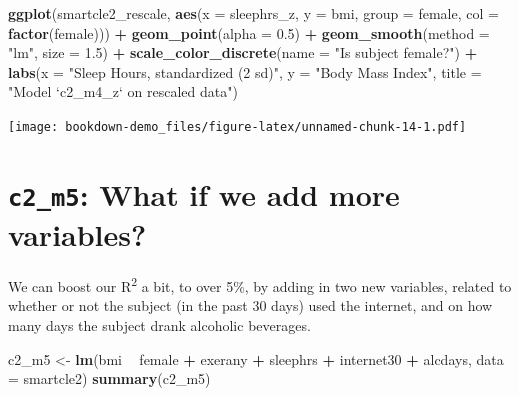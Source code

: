 \documentclass[]{book}
\newenvironment{Shaded}{\begin{snugshade}}{\end{snugshade}}
\newcommand{\KeywordTok}[1]{\textcolor[rgb]{0.13,0.29,0.53}{\textbf{#1}}}
\newcommand{\DataTypeTok}[1]{\textcolor[rgb]{0.13,0.29,0.53}{#1}}
\newcommand{\FloatTok}[1]{\textcolor[rgb]{0.00,0.00,0.81}{#1}}
\newcommand{\StringTok}[1]{\textcolor[rgb]{0.31,0.60,0.02}{#1}}
\newcommand{\OperatorTok}[1]{\textcolor[rgb]{0.81,0.36,0.00}{\textbf{#1}}}
\newcommand{\NormalTok}[1]{#1}
\theoremstyle{definition}
\theoremstyle{definition}
\theoremstyle{definition}
\theoremstyle{remark}
\begin{document}
\begin{Shaded}
\begin{Highlighting}[]
\KeywordTok{ggplot}\NormalTok{(smartcle2_rescale, }\KeywordTok{aes}\NormalTok{(}\DataTypeTok{x =}\NormalTok{ sleephrs_z, }\DataTypeTok{y =}\NormalTok{ bmi, }
                              \DataTypeTok{group =}\NormalTok{ female, }\DataTypeTok{col =} \KeywordTok{factor}\NormalTok{(female))) }\OperatorTok{+}
\StringTok{    }\KeywordTok{geom_point}\NormalTok{(}\DataTypeTok{alpha =} \FloatTok{0.5}\NormalTok{) }\OperatorTok{+}
\StringTok{    }\KeywordTok{geom_smooth}\NormalTok{(}\DataTypeTok{method =} \StringTok{"lm"}\NormalTok{, }\DataTypeTok{size =} \FloatTok{1.5}\NormalTok{) }\OperatorTok{+}
\StringTok{    }\KeywordTok{scale_color_discrete}\NormalTok{(}\DataTypeTok{name =} \StringTok{"Is subject female?"}\NormalTok{) }\OperatorTok{+}
\StringTok{    }\KeywordTok{labs}\NormalTok{(}\DataTypeTok{x =} \StringTok{"Sleep Hours, standardized (2 sd)"}\NormalTok{, }\DataTypeTok{y =} \StringTok{"Body Mass Index"}\NormalTok{,}
         \DataTypeTok{title =} \StringTok{"Model `c2_m4_z` on rescaled data"}\NormalTok{)}
\end{Highlighting}
\end{Shaded}

\texttt{[image: bookdown-demo\_files/figure-latex/unnamed-chunk-14-1.pdf]}

\section{\texorpdfstring{\texttt{c2\_m5}: What if we add more
variables?}{c2\_m5: What if we add more variables?}}\label{c2_m5-what-if-we-add-more-variables}

We can boost our R\textsuperscript{2} a bit, to over 5\%, by adding in
two new variables, related to whether or not the subject (in the past 30
days) used the internet, and on how many days the subject drank
alcoholic beverages.

\begin{Shaded}
\begin{Highlighting}[]
\NormalTok{c2_m5 <-}\StringTok{ }\KeywordTok{lm}\NormalTok{(bmi }\OperatorTok{~}\StringTok{ }\NormalTok{female }\OperatorTok{+}\StringTok{ }\NormalTok{exerany }\OperatorTok{+}\StringTok{ }\NormalTok{sleephrs }\OperatorTok{+}\StringTok{ }\NormalTok{internet30 }\OperatorTok{+}\StringTok{ }\NormalTok{alcdays,}
         \DataTypeTok{data =}\NormalTok{ smartcle2)}
\KeywordTok{summary}\NormalTok{(c2_m5)}
\end{Highlighting}
\end{Shaded}
\end{document}
